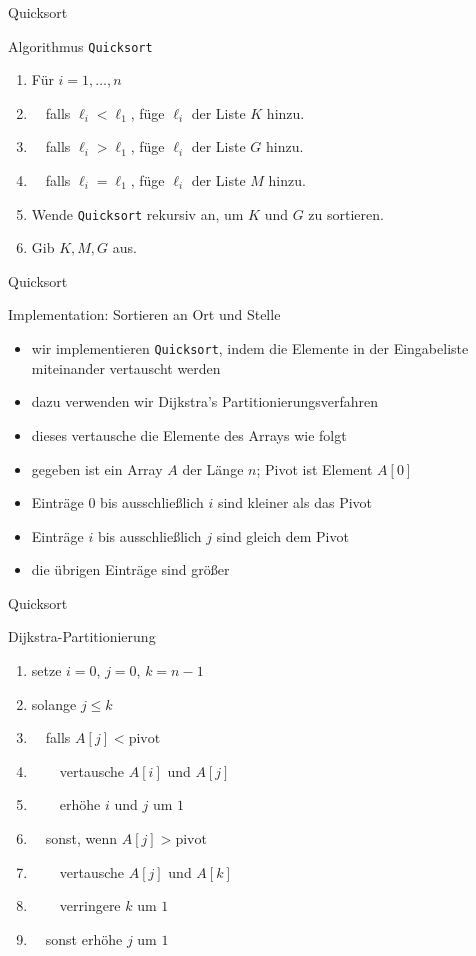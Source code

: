 \documentclass[aspectratio=1610, 11pt]{beamer}
\begin{document}
\begin{frame}{Quicksort}
\begin{exampleblock}{Algorithmus \tt Quicksort}
	\begin{enumerate}
		\item F\"ur $i=1,\ldots,n$
		\item $\quad$falls $\ell_i<\ell_1$, f\"uge $\ell_i$ der Liste $K$ hinzu.
		\item $\quad$falls $\ell_i>\ell_1$, f\"uge $\ell_i$ der Liste $G$ hinzu.
		\item $\quad$falls $\ell_i=\ell_1$, f\"uge $\ell_i$ der Liste $M$ hinzu.
		\item Wende {\tt Quicksort} rekursiv an, um $K$ und $G$ zu sortieren.
		\item Gib $K,M,G$ aus.
	\end{enumerate}
	\end{exampleblock}
\end{frame}

\begin{frame}{Quicksort}
\begin{exampleblock}{Implementation: Sortieren an Ort und Stelle}
	\begin{itemize}
		\item wir implementieren {\tt Quicksort}, indem die Elemente in der Eingabeliste miteinander vertauscht werden
		\item dazu verwenden wir Dijkstra's Partitionierungsverfahren
		\item dieses vertausche die Elemente des Arrays wie folgt
		\item gegeben ist ein Array $A$ der L\"ange $n$; Pivot ist Element $A[0]$
		\item Eintr\"age $0$ bis ausschlie\ss lich $i$ sind kleiner als das Pivot
		\item Eintr\"age $i$ bis ausschlie\ss lich $j$ sind gleich dem Pivot
		\item die \"ubrigen Eintr\"age sind gr\"o\ss er
	\end{itemize}
	\end{exampleblock}
\end{frame}

\begin{frame}{Quicksort}
\begin{exampleblock}{Dijkstra-Partitionierung}
	\begin{enumerate}
		\item setze $i=0$, $j=0$, $k=n-1$
		\item solange $j\leq k$
		\item $\quad$falls $A[j]<\mbox{pivot}$
		\item $\qquad$vertausche $A[i]$ und $A[j]$
		\item $\qquad$erh\"ohe $i$ und $j$ um $1$
		\item $\quad$sonst, wenn $A[j]>\mbox{pivot}$
		\item $\qquad$vertausche $A[j]$ und $A[k]$
		\item $\qquad$verringere $k$ um $1$
		\item $\quad$sonst erh\"ohe $j$ um $1$
	\end{enumerate}
	\end{exampleblock}
\end{frame}
\end{document}
